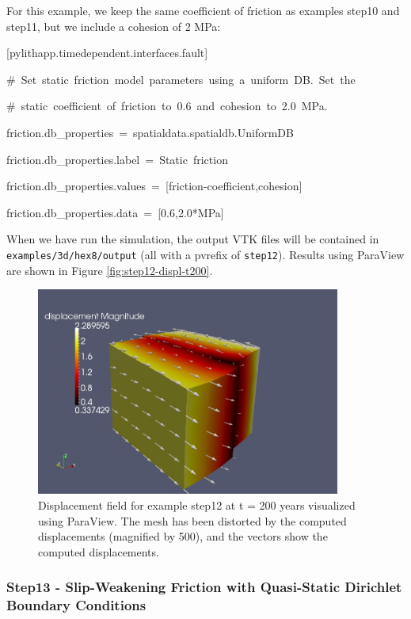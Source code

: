 For this example, we keep the same coefficient of friction as examples
step10 and step11, but we include a cohesion of 2 MPa:
\begin{lyxcode}
{[}pylithapp.timedependent.interfaces.fault{]}

\#~Set~static~friction~model~parameters~using~a~uniform~DB.~Set~the

\#~static~coefficient~of~friction~to~0.6~and~cohesion~to~2.0~MPa.

friction.db\_properties~=~spatialdata.spatialdb.UniformDB

friction.db\_properties.label~=~Static~friction

friction.db\_properties.values~=~{[}friction-coefficient,cohesion{]}

friction.db\_properties.data~=~{[}0.6,2.0{*}MPa{]}
\end{lyxcode}
When we have run the simulation, the output VTK files will be contained
in \texttt{examples/3d/hex8/output} (all with a pvrefix of \texttt{step12}).
Results using ParaView are shown in Figure \vref{fig:step12-displ-t200}.

\begin{figure}
\begin{centering}
\includegraphics[width=10cm]{tutorials/3dhex8/figs/step12-displ-t200}
\par\end{centering}

\caption{Displacement field for example step12 at t = 200 years visualized
using ParaView. The mesh has been distorted by the computed displacements
(magnified by 500), and the vectors show the computed displacements.\label{fig:step12-displ-t200}}
\end{figure}



\subsubsection{Step13 - Slip-Weakening Friction with Quasi-Static Dirichlet Boundary
Conditions}

